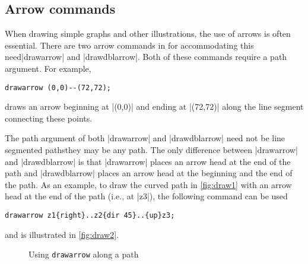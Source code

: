 \subsection{Arrow commands}

When drawing simple graphs and other illustrations, the use of arrows is
often essential.  There are two arrow commands in \MP{} for
accommodating this need\Dash |drawarrow| and |drawdblarrow|.  Both of
these commands require a path argument.  For example,

\begin{lstlisting}[style=MP]
drawarrow (0,0)--(72,72);
\end{lstlisting}
draws an arrow beginning at |(0,0)| and ending at |(72,72)| along the
line segment connecting these points.

The path argument of both |drawarrow| and |drawdblarrow| need not be
line segmented paths\Dash they may be any \MP{} path.  The only
difference between |drawarrow| and |drawdblarrow| is that |drawarrow|
places an arrow head at the end of the path and |drawdblarrow| places an
arrow head at the beginning and the end of the path.  As an example, to
draw the curved path in \autoref{fig:draw1} with an arrow head at the
end of the path (i.e., at |z3|), the following command can be used

\begin{lstlisting}[style=MP]
drawarrow z1{right}..z2{dir 45}..{up}z3;
\end{lstlisting}
and is illustrated in \autoref{fig:draw2}.

\begin{figure}
  \centering
  \caption{Using \texttt{drawarrow} along a path}
  \label{fig:draw2}
\end{figure}
